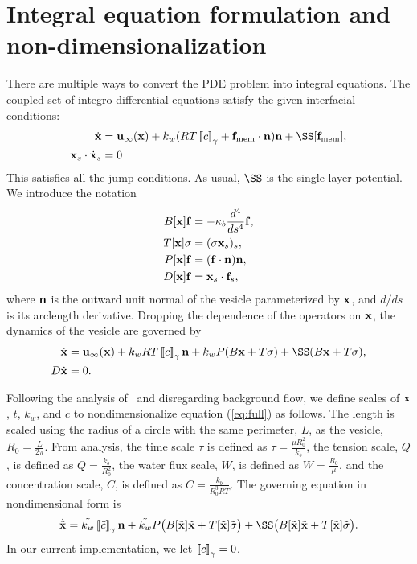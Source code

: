\documentclass[twoside,twocolumn,9pt]{article}
\begin{document}
\section{Integral equation formulation and non-dimensionalization}
There are multiple ways to convert the PDE problem into integral
equations. The coupled set of
integro-differential equations satisfy the given interfacial conditions:
\begin{align}
  \label{eqn:vesVelocity}
  \dot{\mbx} &= \mbu_\infty(\mbx) + k_w
  (RT\jump{c}+\mbf_\text{mem}\cdot\mbn)\mbn
  + \SS [\mbf_\text{mem}],  \\
  \mbx_s\cdot\dot{\mbx}_s &= 0 
\end{align}
This satisfies all the jump conditions. As usual, $\SS$ is the single
layer potential.  We introduce the notation
\begin{align}
  B[\mathbf{x}]\mathbf{f} &= -\kappa_b\frac{d^4}{ds^4} \mathbf{f}, \\
  T[\mathbf{x}]\sigma &= (\sigma \mathbf{x}_s)_s, \\
  P[\mathbf{x}]\mathbf{f} &= (\mathbf{f} \cdot \mathbf{n}) \mathbf{n}, \\
  D[\mathbf{x}]\mathbf{f} &= \mathbf{x}_s \cdot \mathbf{f}_s,
\end{align}
where $\mathbf{n}$ is the outward unit normal of the vesicle parameterized by
$\mathbf{x}$, and $d/ds$ is its arclength derivative.  Dropping the dependence
of the operators on $\mathbf{x}$, the dynamics of the vesicle are governed by
\begin{align}
  \dot{\mbx} &= \mbu_{\infty}(\mbx) + 
  k_wRT\jump{c}\mbn + k_wP(B\mbx + T\sigma) + \SS(B\mbx + T\sigma), \label{eq:full}\\
  D \dot{\mbx} &= 0.
\end{align}

Following the analysis of~\cite{vee-gue-zor-bir2009} and
disregarding background flow, we define scales of $\mathbf{x}$, $t$, $k_w$,
and $c$ to nondimensionalize equation (\ref{eq:full}) as follows. The
length is scaled using the radius of a circle with the same perimeter,
$L$, as the vesicle, $R_0 = \frac{L}{2\pi}$. From analysis, the time
scale $\tau$ is defined as $\tau = \frac{\mu R_0^2}{k_b}$, the tension
scale, $Q$, is defined as $Q = \frac{k_b}{R_0^2}$, the water flux scale,
$W$, is defined as $W=\frac{R_0}{\mu}$, and the concentration scale,
$C$, is defined as $C=\frac{k_b}{R_0^3RT}$. The governing equation in
nondimensional form is
\begin{align}
    \dot{\Tilde{\mbx}} =  \Tilde{k_w}\jump{\tilde{c}}\mbn +
    \Tilde{k_w}P\big(B[\Tilde{\mbx}]\Tilde{\mbx}+T[\Tilde{\mbx}]\Tilde{\sigma}\big)
    +\SS\big( B[\Tilde{\mbx}]\Tilde{\mbx} + T[\Tilde{\mbx}]\Tilde{\sigma}\big).
\end{align}
In our current implementation, we let $\left[\!\left[ c \right]\!\right]_\gamma = 0$.
\end{document}
